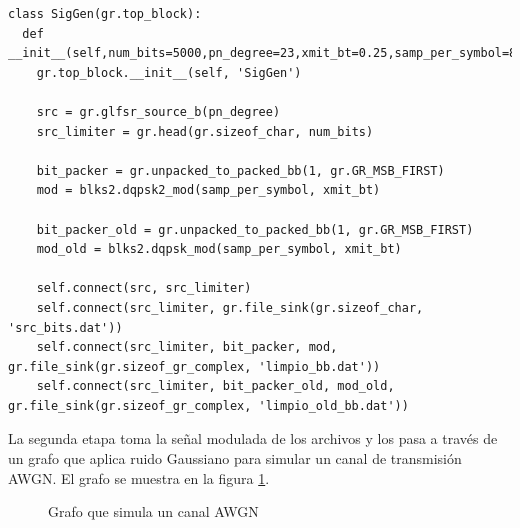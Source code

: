\begin{lstlisting}[float, label=ex:siggen, caption={C\'odigo que implementa el grafo
generador de se\~nales.}, breaklines=true]
class SigGen(gr.top_block):
  def __init__(self,num_bits=5000,pn_degree=23,xmit_bt=0.25,samp_per_symbol=8):
    gr.top_block.__init__(self, 'SigGen')
	
	src = gr.glfsr_source_b(pn_degree)
	src_limiter = gr.head(gr.sizeof_char, num_bits)

    bit_packer = gr.unpacked_to_packed_bb(1, gr.GR_MSB_FIRST)
    mod = blks2.dqpsk2_mod(samp_per_symbol, xmit_bt)

    bit_packer_old = gr.unpacked_to_packed_bb(1, gr.GR_MSB_FIRST)
    mod_old = blks2.dqpsk_mod(samp_per_symbol, xmit_bt)

    self.connect(src, src_limiter)
    self.connect(src_limiter, gr.file_sink(gr.sizeof_char, 'src_bits.dat'))
    self.connect(src_limiter, bit_packer, mod, gr.file_sink(gr.sizeof_gr_complex, 'limpio_bb.dat'))
    self.connect(src_limiter, bit_packer_old, mod_old, gr.file_sink(gr.sizeof_gr_complex, 'limpio_old_bb.dat'))
\end{lstlisting}

La segunda etapa toma la se\~nal modulada de los archivos y los pasa a trav\'es de un grafo que
aplica ruido Gaussiano para simular un canal de transmisi\'on AWGN. El grafo se muestra en la figura
\ref{fig:noisegen}.

\begin{figure}[htp]
  \centering
  \vspace{0.3in}
  \vspace{0.3in}
  \caption{Grafo que simula un canal AWGN}
  \label{fig:noisegen}
\end{figure}

